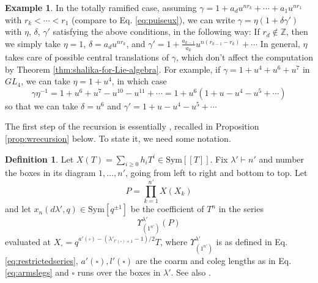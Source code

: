 \documentclass{amsart}
\numberwithin{equation}{section}
\theoremstyle{definition}
\newtheorem{example}[lemma]{Example}%
\newtheorem{definition}[lemma]{Definition}%
\def\Sym{{\mathrm{Sym}}}
\newcommand{\Z}{{\mathbb Z}}
\begin{document}
\begin{example} 
\label{ex:totram}
In the totally ramified case, assuming $\gamma=1+a_d u^{nr_k}+\cdots+a_1 u^{nr_1}$ with $r_k<\cdots < r_1$ (compare to Eq. \eqref{eq:puiseux}), we can write $\gamma=\eta(1+\delta\gamma')$ with $\eta$, $\delta$, $\gamma'$ satisfying the above conditions, in the following way: If $r_d\not\in\Z$, then we simply take $\eta=1$, $\delta=a_du^{nr_k}$, and $\gamma'=1+\frac{a_{k-1}}{a_k}u^{n(r_{k-1}-r_k)}+\cdots$  In general, $\eta$ takes care of possible central translations of $\gamma$, which don't affect the computation by Theorem \ref{thm:shalika-for-Lie-algebra}. For example, if $\gamma=1+u^4+u^6+u^7$ in $GL_4$, we can take 
$\eta=1+u^4$, in which case $$
\gamma\eta^{-1}=1+u^6+u^7-u^{10}-u^{11}+\cdots=1+u^6(1+u-u^4-u^5+\cdots)
$$ so that we can take $\delta=u^6$ and $\gamma'=1+u-u^4-u^5+\cdots$

\end{example}
The first step of the recursion is essentially \cite[Prop. VII 5.]{W2}, recalled in Proposition \ref{prop:wrecursion} below. To state it, we need some notation.
\begin{definition}
\label{def:xm}
Let $X(T)=\sum_{i\geq 0} h_i T^i\in \Sym[[T]]$.
Fix $\lambda'\vdash n'$ and number the boxes in its diagram $1,\ldots, n'$, going from left to right and bottom to top.
Let $$P=\prod_{k=1}^{n'} X(X_k)$$ 
and let $x_n(d\lambda',q)\in\Sym[q^{\pm1}]$ be the coefficient of $T^n$ in the series 
$$\Upsilon_{(1^{n'})}^{\lambda'}(P)$$ evaluated at $X_{\square}=q^{a'(\square)-(\lambda'_{l'(\square)+1}-1)/2}T$, where $\Upsilon_{(1^{n'})}^{\lambda'}$ is as defined in Eq. \eqref{eq:restrictedseries}, $a'(\square), l'(\square)$ are the coarm and coleg lengths as in Eq. \eqref{eq:armslegs} and $\square$ runs over the boxes in $\lambda'$. See also \cite[Section I 10., V 12.]{W2}. 
\end{definition}
\end{document}
